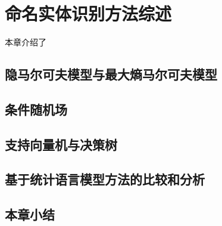 \chapter{命名实体识别方法综述}
本章介绍了
\section{隐马尔可夫模型与最大熵马尔可夫模型}
\section{条件随机场}
\section{支持向量机与决策树}
\section{基于统计语言模型方法的比较和分析}
\section{本章小结}
